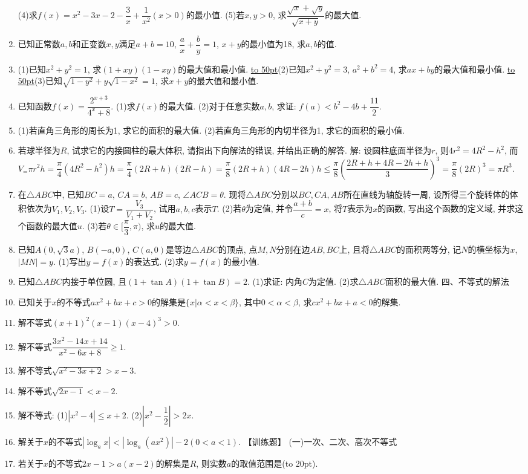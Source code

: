 \documentclass[10pt,a4paper]{article}
\newcommand{\blank}[1]{\underline{\hbox to #1pt{}}}
\newcommand{\bracket}[1]{(\hbox to #1pt{})}
\begin{document}
\begin{enumerate}[1.]
    (4)求$f(x)={x^2}-3x-2-\dfrac 3x+\dfrac 1{x^2}(x>0)$的最小值.
    (5)若$x,y>0$, 求$\dfrac{\sqrt x+\sqrt y}{\sqrt{x+y}}$的最大值.
    \item 已知正常数$a,b$和正变数$x,y$满足$a+b=10$, $\dfrac ax+\dfrac by=1$, $x+y$的最小值为18, 求$a,b$的值.
    \item (1)已知$x^2+y^2=1$, 求$(1+xy)(1-xy)$的最大值和最小值.
    \blank{50}(2)已知$x^2+y^2=3$, $a^2+b^2=4$, 求$ax+by$的最大值和最小值.
    \blank{50}(3)已知$\sqrt{1-{y^2}}+y\sqrt{1-{x^2}}=1$, 求$x+y$的最大值和最小值.
    \item 已知函数$f(x)=\dfrac{{2^{x+3}}}{{4^x}+8}$.
        (1)求$f(x)$的最大值.
    (2)对于任意实数$a,b$, 求证: $f(a)<{b^2}-4b+\dfrac{11}2$.
    \item (1)若直角三角形的周长为1, 求它的面积的最大值.
        (2)若直角三角形的内切半径为1, 求它的面积的最小值.
    \item 若球半径为$R$, 试求它的内接圆柱的最大体积, 请指出下向解法的错误, 并给出正确的解答.
    解: 设圆柱底面半径为$r$, 则$4r^2=4R^2-h^2$, 而$V_=\pi {r^2}h=\dfrac{\pi }4(4{R^2}-{h^2})h=\dfrac{\pi }4(2R+h)(2R-h)=\dfrac{\pi }8(2R+h)(4R-2h)h\le \dfrac{\pi }8(\dfrac{2R+h+4R-2h+h}3)^3=\dfrac{\pi }8(2R)^3=\pi {R^3}$.
    \item 在$\triangle ABC$中, 已知$BC=a$, $CA=b$, $AB=c$, $\angle ACB=\theta$. 现将$\triangle ABC$分别以$BC,CA,AB$所在直线为轴旋转一周, 设所得三个旋转体的体积依次为$V_1,V_2,V_3$.
    (1)设$T=\dfrac{V_3}{{V_1}+V_2}$, 试用$a,b,c$表示$T$.
    (2)若$\theta$为定值, 并令$\dfrac{a+b}c=x$, 将$T$表示为$x$的函数, 写出这个函数的定义域, 并求这个函数的最大值$u$.
    (3)若$\theta \in [ \dfrac{\pi }3,\pi)$, 求$u$的最大值.
    \item 已知$A(0,\sqrt 3a)$, $B(-a,0)$, $C(a,0)$是等边$\triangle ABC$的顶点, 点$M,N$分别在边$AB,BC$上, 且将$\triangle ABC$的面积两等分, 记$N$的横坐标为$x$, $|MN|=y$.
    (1)写出$y=f(x)$的表达式.
    (2)求$y=f(x)$的最小值.
    \item 已知$\triangle ABC$内接于单位圆, 且$(1+\tan A)(1+\tan B)=2$.
    (1)求证: 内角$C$为定值.
    (2)求$\triangle ABC$面积的最大值.
    四、不等式的解法
    \item 已知关于$x$的不等式$ax^2+bx+c>0$的解集是$\{x|\alpha <x<\beta\}$, 其中$0<\alpha <\beta$, 求$cx^2+bx+a<0$的解集.
    \item 解不等式$(x+1)^2(x-1)(x-4)^3>0$.
    \item 解不等式$\dfrac{3{x^2}-14x+14}{{x^2}-6x+8}\ge 1$.
    \item 解不等式$\sqrt{{x^2}-3x+2}>x-3$.
    \item 解不等式$\sqrt{2x-1}<x-2$.
    \item 解不等式:
    (1)$|x^2-4|\le x+2$.			(2)$|{x^2}-\dfrac 12|>2x$.
    \item 解关于$x$的不等式$|\log_ax|<|\log_a(ax^2)|-2(0<a<1)$.
    【训练题】
    (一)一次、二次、高次不等式
    \item 若关于$x$的不等式$2x-1>a(x-2)$的解集是$R$, 则实数$a$的取值范围是\bracket{20}.
    

\end{enumerate}
\end{document}

